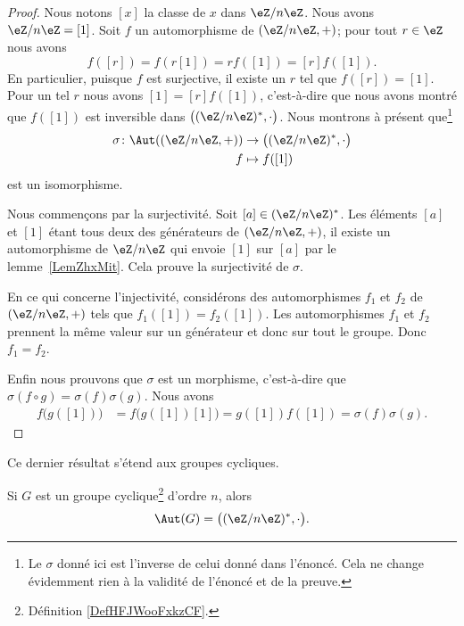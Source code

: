 \begin{proof}
	Nous notons \( [x]\) la classe de \( x\) dans \( \eZ/n\eZ\). Nous avons \( \eZ/n\eZ=[1]\). Soit \( f\) un automorphisme de \( (\eZ/n\eZ,+)\); pour tout \( r\in \eZ\) nous avons
	\begin{equation}
		f([r])=f(r[1])=rf([1])=[r]f([1]).
	\end{equation}
	En particulier, puisque \( f\) est surjective, il existe un \( r\) tel que \( f([r])=[1]\). Pour un tel \( r\) nous avons \( [1]=[r]f([1])\), c'est-à-dire que nous avons montré que \( f([1])\) est inversible dans \(  \big( (\eZ/n\eZ)^*,\cdot\big)\). Nous montrons à présent que\footnote{Le \( \sigma\) donné ici est l'inverse de celui donné dans l'énoncé. Cela ne change évidemment rien à la validité de l'énoncé et de la preuve.}
	\begin{equation}
		\begin{aligned}
			\sigma\colon \Aut( (\eZ/n\eZ,+)) & \to \big( (\eZ/n\eZ)^*,\cdot \big) \\
			f                                & \mapsto f([1])
		\end{aligned}
	\end{equation}
	est un isomorphisme.

	Nous commençons par la surjectivité. Soit \( [a]\in (\eZ/n\eZ)^*\). Les éléments \( [a]\) et \( [1]\) étant tous deux des générateurs de \( (\eZ/n\eZ,+)\), il existe un automorphisme de \( \eZ/n\eZ\) qui envoie \( [1]\) sur \( [a]\) par le lemme~\ref{LemZhxMit}. Cela prouve la surjectivité de \( \sigma\).

	En ce qui concerne l'injectivité, considérons des automorphismes \( f_1\) et \( f_2\) de \( (\eZ/n\eZ,+)\) tels que \( f_1([1])=f_2([1])\). Les automorphismes \( f_1\) et \( f_2\) prennent la même valeur sur un générateur et donc sur tout le groupe. Donc \( f_1=f_2\).

	Enfin nous prouvons que \( \sigma\) est un morphisme, c'est-à-dire que \( \sigma(f\circ g)=\sigma(f)\sigma(g)\). Nous avons
	\begin{subequations}
		\begin{align}
			f\big( g([1]) \big) & =f\big( g([1])[1] \big)=g([1])f([1])=\sigma(f)\sigma(g).
		\end{align}
	\end{subequations}
\end{proof}

Ce dernier résultat s'étend aux groupes cycliques.
\begin{proposition}     \label{PROPooBZOMooVOHoYf}
	Si \( G\) est un groupe cyclique\footnote{Définition \ref{DefHFJWooFxkzCF}.} d'ordre \( n\), alors
	\begin{equation}
		\Aut(G)=\big( (\eZ/n\eZ)^*,\cdot\big).
	\end{equation}
\end{proposition}

